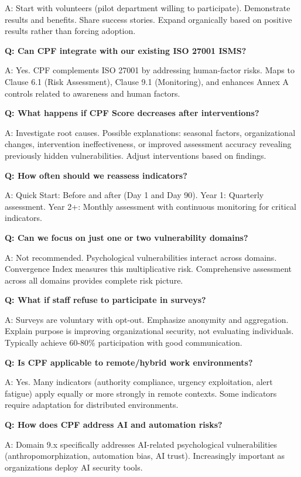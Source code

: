 \documentclass[11pt,a4paper]{article}
\begin{document}
A: Start with volunteers (pilot department willing to participate). Demonstrate results and benefits. Share success stories. Expand organically based on positive results rather than forcing adoption.

\textbf{Q: Can CPF integrate with our existing ISO 27001 ISMS?}

A: Yes. CPF complements ISO 27001 by addressing human-factor risks. Maps to Clause 6.1 (Risk Assessment), Clause 9.1 (Monitoring), and enhances Annex A controls related to awareness and human factors.

\textbf{Q: What happens if CPF Score decreases after interventions?}

A: Investigate root causes. Possible explanations: seasonal factors, organizational changes, intervention ineffectiveness, or improved assessment accuracy revealing previously hidden vulnerabilities. Adjust interventions based on findings.

\textbf{Q: How often should we reassess indicators?}

A: Quick Start: Before and after (Day 1 and Day 90). Year 1: Quarterly assessment. Year 2+: Monthly assessment with continuous monitoring for critical indicators.

\textbf{Q: Can we focus on just one or two vulnerability domains?}

A: Not recommended. Psychological vulnerabilities interact across domains. Convergence Index measures this multiplicative risk. Comprehensive assessment across all domains provides complete risk picture.

\textbf{Q: What if staff refuse to participate in surveys?}

A: Surveys are voluntary with opt-out. Emphasize anonymity and aggregation. Explain purpose is improving organizational security, not evaluating individuals. Typically achieve 60-80\% participation with good communication.

\textbf{Q: Is CPF applicable to remote/hybrid work environments?}

A: Yes. Many indicators (authority compliance, urgency exploitation, alert fatigue) apply equally or more strongly in remote contexts. Some indicators require adaptation for distributed environments.

\textbf{Q: How does CPF address AI and automation risks?}

A: Domain 9.x specifically addresses AI-related psychological vulnerabilities (anthropomorphization, automation bias, AI trust). Increasingly important as organizations deploy AI security tools.
\end{document}
